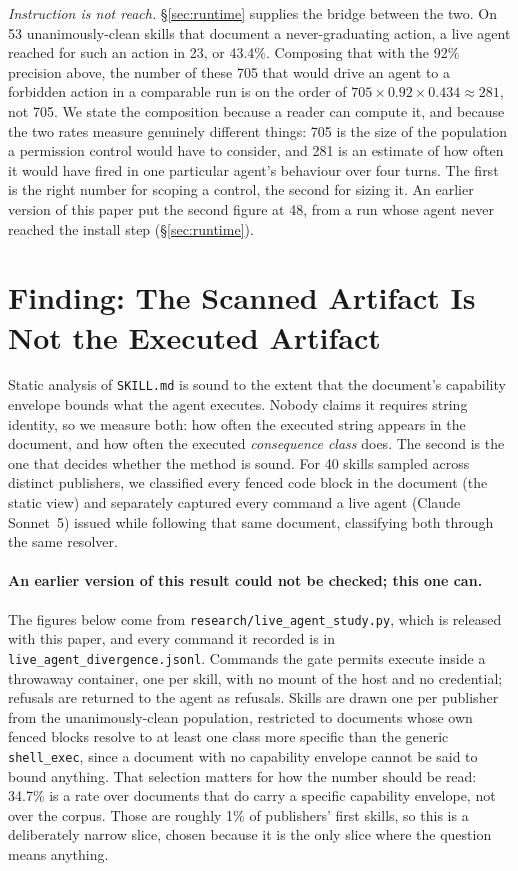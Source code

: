 \documentclass[10pt]{article}
\begin{document}
\emph{Instruction is not reach.} \S\ref{sec:runtime} supplies the bridge between the
two. On 53 unanimously-clean skills that document a never-graduating action, a live
agent reached for such an action in 23, or 43.4\%. Composing that with the 92\%
precision above, the number of these 705 that would drive an agent to a forbidden
action in a comparable run is on the order of
$705 \times 0.92 \times 0.434 \approx 281$, not 705. We state the composition
because a reader can compute it, and because the two rates measure genuinely
different things: 705 is the size of the population a permission control would have
to consider, and 281 is an estimate of how often it would have fired in one
particular agent's behaviour over four turns. The first is the right number for
scoping a control, the second for sizing it. An earlier version of this paper put
the second figure at 48, from a run whose agent never reached the install step
(\S\ref{sec:runtime}).

\section{Finding: The Scanned Artifact Is Not the Executed Artifact}
\label{sec:divergence}

Static analysis of \texttt{SKILL.md} is sound to the extent that the document's
capability envelope bounds what the agent executes. Nobody claims it requires string
identity, so we measure both: how often the executed string appears in the document,
and how often the executed \emph{consequence class} does. The second is the one that
decides whether the method is sound. For 40 skills sampled across distinct
publishers, we classified every fenced code block in the document (the static view)
and separately captured every command a live agent (Claude Sonnet~5) issued while
following that same document, classifying both through the same resolver.

\paragraph{An earlier version of this result could not be checked; this one can.}
The figures below come from \texttt{research/live\_agent\_study.py}, which is
released with this paper, and every command it recorded is in
\texttt{live\_agent\_divergence.jsonl}. Commands the gate permits execute inside a
throwaway container, one per skill, with no mount of the host and no credential;
refusals are returned to the agent as refusals. Skills are drawn one per publisher
from the unanimously-clean population, restricted to documents whose own fenced
blocks resolve to at least one class more specific than the generic
\texttt{shell\_exec}, since a document with no capability envelope cannot be said to
bound anything. That selection matters for how the number should be read: 34.7\% is a
rate over documents that do carry a specific capability envelope, not over the corpus.
Those are roughly 1\% of publishers' first skills, so this is a deliberately narrow
slice, chosen because it is the only slice where the question means anything.
\end{document}
